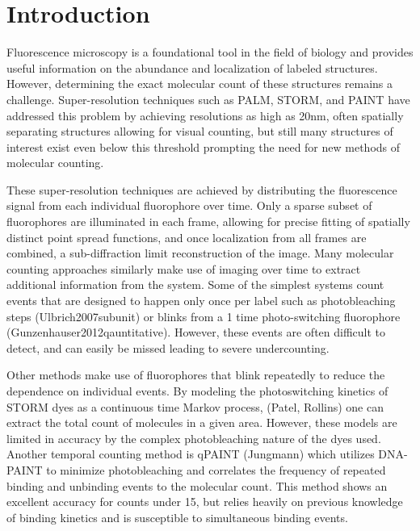\section{Introduction}

Fluorescence microscopy is a foundational tool in the field of biology and
provides useful information on the abundance and localization of labeled
structures.
%
  However, determining the exact molecular count of these structures remains a
  challenge. Super-resolution techniques such as PALM, STORM, and PAINT have
  addressed this problem by achieving resolutions as high as 20nm, often
  spatially separating structures allowing for visual counting, but still many
  structures of interest exist even below this threshold prompting the need for
  new methods of molecular counting.

These super-resolution techniques are achieved by distributing the fluorescence
signal from each individual fluorophore over time.
%
  Only a sparse subset of fluorophores are illuminated in each frame, allowing
  for precise fitting of spatially distinct point spread functions, and once
  localization from all frames are combined, a sub-diffraction limit
  reconstruction of the image. Many molecular counting approaches similarly
  make use of imaging over time to extract additional information from the
  system. Some of the simplest systems count events that are designed to happen
  only once per label such as photobleaching steps (Ulbrich2007subunit) or
  blinks from a 1 time photo-switching fluorophore
  (Gunzenhauser2012qauntitative). However, these events are often difficult to
  detect, and can easily be missed leading to severe undercounting.

Other methods make use of fluorophores that blink repeatedly to reduce the
dependence on individual events.
%
  By modeling the photoswitching kinetics of STORM dyes as a continuous time
  Markov process, (Patel, Rollins) one can extract the total count of molecules
  in a given area. However, these models are limited in accuracy by the complex
  photobleaching nature of the dyes used. Another temporal counting method is
  qPAINT (Jungmann) which utilizes DNA-PAINT to minimize photobleaching and
  correlates the frequency of repeated binding and unbinding events to the
  molecular count. This method shows an excellent accuracy for counts under 15,
  but relies heavily on previous knowledge of binding kinetics and is
  susceptible to simultaneous binding events.

